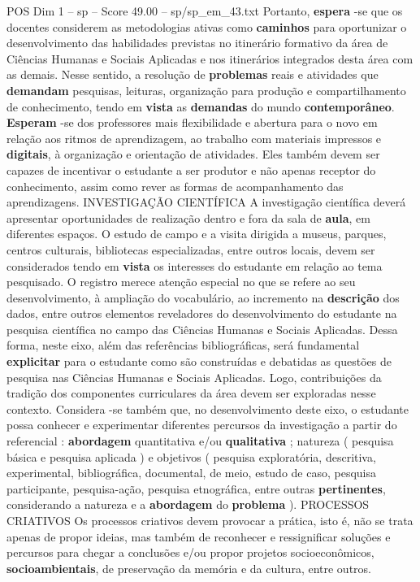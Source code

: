 \begin{textsample}{POS Dim 1 – sp – Score 49.00 – sp/sp\_em\_43.txt}
Portanto, \textbf{espera} -se que os docentes considerem as metodologias ativas como \textbf{caminhos} para oportunizar o desenvolvimento das habilidades previstas no itinerário formativo da área de Ciências Humanas e Sociais Aplicadas e nos itinerários integrados desta área com as demais.
Nesse sentido, a resolução de \textbf{problemas} reais e atividades que \textbf{demandam} pesquisas, leituras, organização para produção e compartilhamento de conhecimento, tendo em \textbf{vista} as \textbf{demandas} do mundo \textbf{contemporâneo}. \textbf{Esperam} -se dos professores mais flexibilidade e abertura para o novo em relação aos ritmos de aprendizagem, ao trabalho com materiais impressos e \textbf{digitais}, à organização e orientação de atividades.
Eles também devem ser capazes de incentivar o estudante a ser produtor e não apenas receptor do conhecimento, assim como rever as formas de acompanhamento das aprendizagens.
INVESTIGAÇÃO CIENTÍFICA A investigação científica deverá apresentar oportunidades de realização dentro e fora da sala de \textbf{aula}, em diferentes espaços.
O estudo de campo e a visita dirigida a museus, parques, centros culturais, bibliotecas especializadas, entre outros locais, devem ser considerados tendo em \textbf{vista} os interesses do estudante em relação ao tema pesquisado.
O registro merece atenção especial no que se refere ao seu desenvolvimento, à ampliação do vocabulário, ao incremento na \textbf{descrição} dos dados, entre outros elementos reveladores do desenvolvimento do estudante na pesquisa científica no campo das Ciências Humanas e Sociais Aplicadas.
Dessa forma, neste eixo, além das referências bibliográficas, será fundamental \textbf{explicitar} para o estudante como são construídas e debatidas as questões de pesquisa nas Ciências Humanas e Sociais Aplicadas.
Logo, contribuições da tradição dos componentes curriculares da área devem ser exploradas nesse contexto.
Considera -se também que, no desenvolvimento deste eixo, o estudante possa conhecer e experimentar diferentes percursos da investigação a partir do referencial : \textbf{abordagem} quantitativa e/ou \textbf{qualitativa} ; natureza ( pesquisa básica e pesquisa aplicada ) e objetivos ( pesquisa exploratória, descritiva, experimental, bibliográfica, documental, de meio, estudo de caso, pesquisa participante, pesquisa-ação, pesquisa etnográfica, entre outras \textbf{pertinentes}, considerando a natureza e a \textbf{abordagem} do \textbf{problema} ).
PROCESSOS CRIATIVOS Os processos criativos devem provocar a prática, isto é, não se trata apenas de propor ideias, mas também de reconhecer e ressignificar soluções e percursos para chegar a conclusões e/ou propor projetos socioeconômicos, \textbf{socioambientais}, de preservação da memória e da cultura, entre outros.

\end{textsample}
